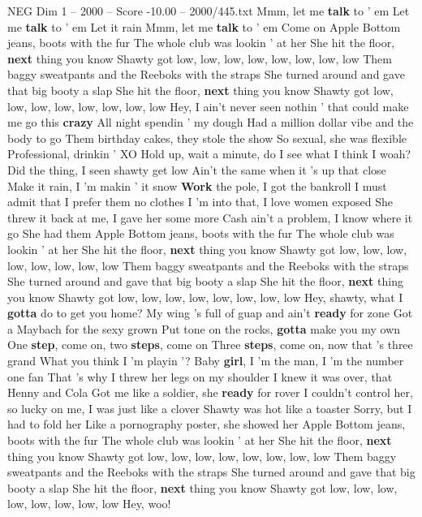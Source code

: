 \begin{textsample}{NEG Dim 1 – 2000 – Score -10.00 – 2000/445.txt}  \label{ex:f1_neg_006}
Mmm, let me \textbf{talk} to ' em Let me \textbf{talk} to ' em Let it rain Mmm, let me \textbf{talk} to ' em Come on Apple Bottom jeans, boots with the fur The whole club was lookin ' at her She hit the floor, \textbf{next} thing you know Shawty got low, low, low, low, low, low, low, low Them baggy sweatpants and the Reeboks with the straps She turned around and gave that big booty a slap She hit the floor, \textbf{next} thing you know Shawty got low, low, low, low, low, low, low, low Hey, I ain't never seen nothin ' that could make me go this \textbf{crazy} All night spendin ' my dough Had a million dollar vibe and the body to go Them birthday cakes, they stole the show So sexual, she was flexible Professional, drinkin ' XO Hold up, wait a minute, do I see what I think I woah?
Did the thing, I seen shawty get low Ain't the same when it 's up that close Make it rain, I 'm makin ' it snow \textbf{Work} the pole, I got the bankroll I must admit that I prefer them no clothes I 'm into that, I love women exposed She threw it back at me, I gave her some more Cash ain't a problem, I know where it go She had them Apple Bottom jeans, boots with the fur The whole club was lookin ' at her She hit the floor, \textbf{next} thing you know Shawty got low, low, low, low, low, low, low, low Them baggy sweatpants and the Reeboks with the straps She turned around and gave that big booty a slap She hit the floor, \textbf{next} thing you know Shawty got low, low, low, low, low, low, low, low Hey, shawty, what I \textbf{gotta} do to get you home?
My wing 's full of guap and ain't \textbf{ready} for zone Got a Maybach for the sexy grown Put tone on the rocks, \textbf{gotta} make you my own One \textbf{step}, come on, two \textbf{steps}, come on Three \textbf{steps}, come on, now that 's three grand What you think I 'm playin '?
Baby \textbf{girl}, I 'm the man, I 'm the number one fan That 's why I threw her legs on my shoulder I knew it was over, that Henny and Cola Got me like a soldier, she \textbf{ready} for rover I couldn't control her, so lucky on me, I was just like a clover Shawty was hot like a toaster Sorry, but I had to fold her Like a pornography poster, she showed her Apple Bottom jeans, boots with the fur The whole club was lookin ' at her She hit the floor, \textbf{next} thing you know Shawty got low, low, low, low, low, low, low, low Them baggy sweatpants and the Reeboks with the straps She turned around and gave that big booty a slap She hit the floor, \textbf{next} thing you know Shawty got low, low, low, low, low, low, low, low Hey, woo!

\end{textsample}
